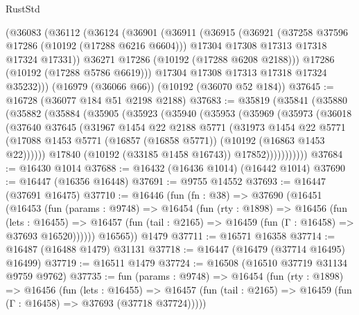 \begin{lexlean}{RustStd}
\begin{coremodule}
    (@36083
      (@36112
        (@36124
          (@36901
            (@36911
              (@36915
                (@36921
                  (@37258 @37596 @17286 (@10192 (@17288 @6216 @6604)))
                  @17304
                  @17308
                  @17313
                  @17318
                  @17324
                  @17331))
              @36271
              @17286
              (@10192 (@17288 @6208 @2188)))
            @17286
            (@10192 (@17288 @5786 @6619)))
          @17304
          @17308
          @17313
          @17318
          @17324
          @35232)))
    (@16979 (@36066 @66))
    (@10192 (@36070 @52 @184))
@37645 := @16728 (@36077 @184 @51 @2198 @2188)
@37683 := @35819
    (@35841
      (@35880
        (@35882
          (@35884
            (@35905
              (@35923
                (@35940
                  (@35953
                    (@35969
                      (@35973
                        (@36018
                          (@37640
                            @37645
                            (@31967
                              @1454
                              @22
                              @2188
                              @5771
                              (@31973
                                @1454
                                @22
                                @5771
                                (@17088
                                  @1453
                                  @5771
                                  (@16857 (@16858 @5771))
                                  (@10192 (@16863 @1453 @22))))))
                          @17840
                          (@10192 (@33185 @1458 @16743))
                          @17852)))))))))))
@37684 := @16430 @1014
@37688 := @16432 (@16436 @1014) (@16442 @1014)
@37690 := @16447 (@16356 @16448)
@37691 := @9755 @14552
@37693 := @16447 (@37691 @16475)
@37710 := @16446
    (fun (fn : @38) =>
    @37690
      (@16451
        (@16453
          (fun (params : @9748) =>
          @16454
            (fun (rty : @1898) =>
            @16456
              (fun (lets : @16455) =>
              @16457 (fun (tail : @2165) => @16459 (fun (Γ : @16458) => @37693 @16520))))))
        @16565))
    @1479
@37711 := @16571 @16358
@37714 := @16487 (@16488 @1479) @31131
@37718 := @16447 (@16479 (@37714 @16495) @16499)
@37719 := @16511 @1479
@37724 := @16508 (@16510 @37719 @31134 @9759 @9762)
@37735 := fun (params : @9748) =>
  @16454
    (fun (rty : @1898) =>
    @16456
      (fun (lets : @16455) =>
      @16457 (fun (tail : @2165) => @16459 (fun (Γ : @16458) => @37693 (@37718 @37724)))))

\end{coremodule}
\end{lexlean}
